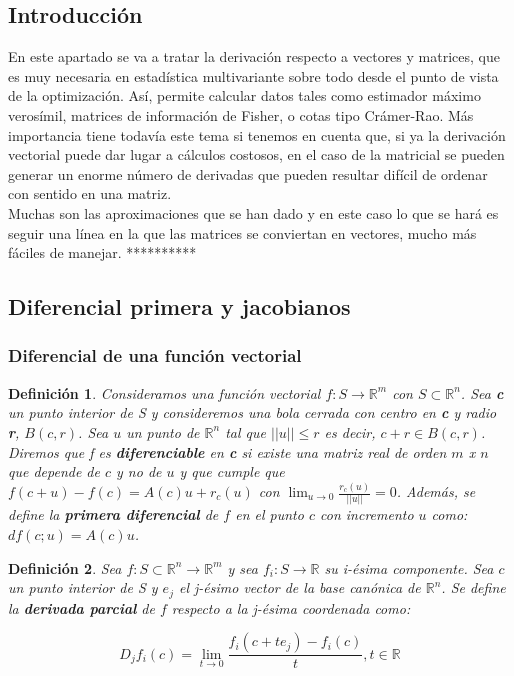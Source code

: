 \documentclass{article}
\theoremstyle{theorem-style}  %
\theoremstyle{definition-style}
\newtheorem{definition}{Definición}[section]
\theoremstyle{example-style}
\theoremstyle{exercise-style}
\begin{document}
\subsection{Introducción}

En este apartado se va a tratar la derivación respecto a vectores y matrices, que es muy necesaria en estadística multivariante sobre todo desde el punto de vista de la optimización. Así, permite calcular datos tales como estimador máximo verosímil, matrices de información de Fisher, o cotas tipo Crámer-Rao. Más importancia tiene todavía este tema si tenemos en cuenta que, si ya la derivación vectorial puede dar lugar a cálculos costosos, en el caso de la matricial se pueden generar un enorme número de derivadas que pueden resultar difícil de ordenar con sentido en una matriz. \\

Muchas son las aproximaciones que se han dado y en este caso lo que se hará es seguir una línea en la que las matrices se conviertan en vectores, mucho más fáciles de manejar. **********

\subsection{Diferencial primera y jacobianos}

\subsubsection{Diferencial de una función vectorial}

\begin{definition}
	Consideramos una función vectorial $f: S \rightarrow \mathbb{R}^m$ con $S\subset \mathbb{R}^n$. Sea \textbf{c} un punto interior de S y consideremos una bola cerrada con centro en \textbf{c} y radio \textbf{r}, $B(c,r)$. Sea $u$ un punto de $\mathbb{R}^n$ tal que $||u||\leq r$ es decir, $c+r \in B(c,r)$.\\ 
	Diremos que f es \textbf{diferenciable} en \textbf{c} si existe una matriz real de orden $m$ x $n$ que depende de $c$ y no de $u$ y que cumple que $f(c+u)-f(c) = A(c)u + r_c(u)$ con $\lim_{u\to0} \frac{r_c(u)}{||u||} = 0$. Además, se define la \textbf{primera diferencial} de $f$ en el punto $c$ con incremento $u$ como: $df(c;u)=A(c)u$.
\end{definition}

\begin{definition}
	
 Sea $f: S\subset \mathbb{R}^n \rightarrow \mathbb{R}^m$ y sea $f_i: S \rightarrow \mathbb{R}$ su i-ésima componente. Sea $c$ un punto interior de S y $e_j$ el j-ésimo vector de la base canónica de $\mathbb{R}^n$. Se define la \textbf{derivada parcial} de $f$ respecto a la j-ésima coordenada como: 

$$ D_jf_i(c) = \lim_{t\to0} \frac{f_i(c + te_j ) - f_i(c)}{t}, t\in \mathbb{R} $$  
\end{definition}
 
\end{document}
